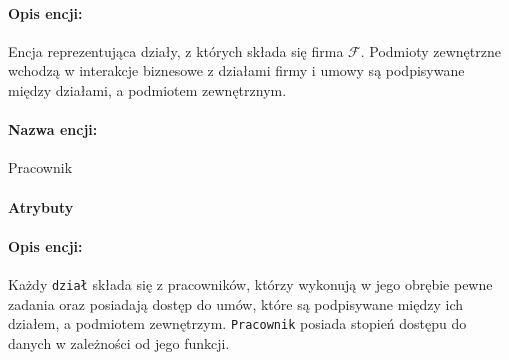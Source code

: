\documentclass{article}
\begin{document}
\paragraph{Opis encji: \\}
Encja reprezentująca działy, z których składa się firma $\mathcal{F}$. Podmioty zewnętrzne wchodzą w interakcje 
biznesowe z działami firmy i umowy są podpisywane między działami, a podmiotem zewnętrznym.
\paragraph{Nazwa encji:\\ }
Pracownik
\paragraph{Atrybuty\\ }
\begin{table}[H]
\caption{Tabela z opisem encji.} 
\end{table}
\paragraph{Opis encji: \\}
Każdy \texttt{dział} składa się z pracowników, którzy wykonują w jego obrębie pewne zadania oraz posiadają dostęp do
umów, które są podpisywane między ich działem, a podmiotem zewnętrzym. \texttt{Pracownik} posiada stopień dostępu do danych w zależności od jego funkcji.
\end{document}

